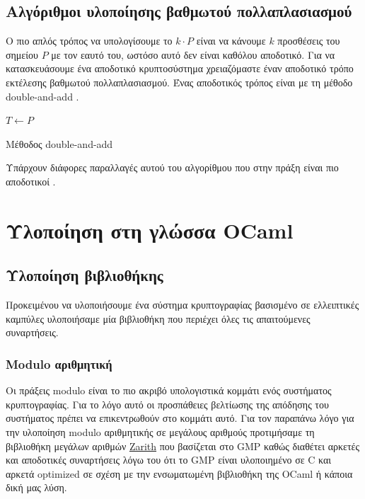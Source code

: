 \documentclass[12pt]{article}
\begin{document}
\subsection{Αλγόριθμοι υλοποίησης βαθμωτού πολλαπλασιασμού}
Ο πιο απλός τρόπος να υπολογίσουμε το $k \cdot P$ είναι να κάνουμε $k$ προσθέσεις του σημείου $P$ με τον εαυτό του, ωστόσο αυτό δεν είναι καθόλου αποδοτικό.
Για να κατασκευάσουμε ένα αποδοτικό κρυπτοσύστημα χρειαζόμαστε έναν αποδοτικό τρόπο εκτέλεσης βαθμωτού πολλαπλασιασμού.
Ένας αποδοτικός τρόπος είναι με τη μέθοδο double-and-add \cite{PAAR}.

\begin{algorithm}[H]
\SetAlgoNoLine 
 $T \leftarrow P$ \\
\caption{Μέθοδος double-and-add}
\end{algorithm}
\medskip
Υπάρχουν διάφορες παραλλαγές αυτού του αλγορίθμου που στην πράξη είναι πιο αποδοτικοί \cite{BERN}.
\pagebreak

\section{Υλοποίηση στη γλώσσα OCaml}
\subsection{Υλοποίηση βιβλιοθήκης}
Προκειμένου να υλοποιήσουμε ένα σύστημα κρυπτογραφίας βασισμένο σε ελλειπτικές καμπύλες  υλοποιήσαμε μία βιβλιοθήκη που περιέχει όλες τις απαιτούμενες συναρτήσεις.
\subsubsection{Modulo αριθμητική}
Οι πράξεις modulo είναι το πιο ακριβό υπολογιστικά κομμάτι ενός συστήματος κρυπτογραφίας. Για το λόγο αυτό οι προσπάθειες βελτίωσης της απόδησης του συστήματος πρέπει να επικεντρωθούν στο κομμάτι αυτό. 
Για τον παραπάνω λόγο για την υλοποίηση modulo αριθμητικής σε μεγάλους αριθμούς προτιμήσαμε τη βιβλιοθήκη μεγάλων αριθμών \href{http://forge.ocamlcore.org/projects/zarith}{Zarith} που βασίζεται στο GMP καθώς διαθέτει αρκετές και αποδοτικές συναρτήσεις λόγω του ότι το GMP είναι υλοποιημένο σε C και αρκετά optimized σε σχέση με την ενσωματωμένη βιβλιοθήκη της OCaml ή κάποια δική μας λύση.
\end{document}
